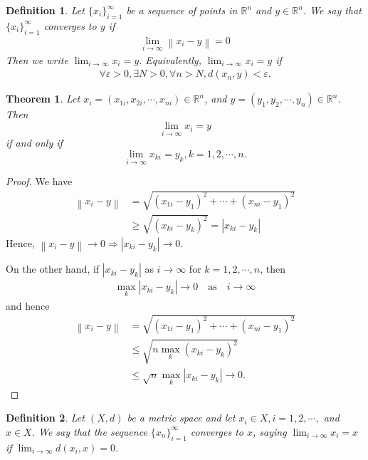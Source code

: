 \documentclass[12pt,leqno]{amsart}
\newtheorem{definition}{Definition}[section]
\newtheorem{theorem}{Theorem}[section]
\theoremstyle{definition}
\numberwithin{equation}{subsection}
\begin{document}
\begin{definition}
Let $\{x_i\}^\infty_{i=1}$ be a sequence of points in $\mathbb{R}^n$ and $y\in\mathbb{R}^n$. We say that $\{x_i\}^\infty_{i=1}$ converges to $y$ if 
\begin{align*}
    \lim_{i\to\infty}\left\|x_i - y \right\| = 0
\end{align*}
Then we write $\lim_{i\to\infty}x_i = y$. Equivalently, $\lim_{i\to\infty}x_i = y$ if \begin{align*}
    \forall \varepsilon > 0, \exists N > 0, \forall n > N, d(x_n, y) < \varepsilon.
\end{align*}
\end{definition}

\medskip

\begin{theorem}
Let $x_i = (x_{1i}, x_{2i}, \cdots, x_{ni}) \in \mathbb{R}^n$, and $y = (y_{1}, y_{2}, \cdots, y_{n}) \in \mathbb{R}^n$. Then 
$$\lim_{i\to\infty}x_i = y$$ if and only if $$\lim_{i\to\infty}x_{ki} = y_k,k = 1,2,\cdots,n.$$
\end{theorem}
\begin{proof}
We have 
\begin{align*}
    \left\|x_i - y\right\| & = \sqrt{(x_{1i}-y_1)^2 + \cdots + (x_{ni}-y_1)^2} \\
    & \geq \sqrt{(x_{ki}-y_k)^2} = |x_{ki} - y_k|
\end{align*}
Hence, $\left\|x_i - y\right\| \to 0 \Rightarrow |x_{ki} - y_k| \to 0$.

On the other hand, if $|x_{ki} - y_k|$ as $i\to\infty$ for $k = 1,2,\cdots, n$, then
\begin{align*}
    \max_k |x_{ki} - y_k| \to 0 \quad \text{as}\quad i\to\infty
\end{align*}
and hence
\begin{align*}
    \left\|x_i - y\right\| & = \sqrt{(x_{1i}-y_1)^2 + \cdots + (x_{ni}-y_1)^2} \\
    & \leq \sqrt{n \max_k (x_{ki}-y_k)^2} \\
    & \leq \sqrt{n} \max_k |x_{ki} - y_k| \to 0.
\end{align*}
\end{proof}

\begin{definition}
Let $(X,d)$ be a metric space and let $x_i\in X, i = 1,2,\cdots,$ and $x\in X$. We say that the sequence $\{x_n\}^\infty_{i=1}$ converges to $x$, saying
$\lim_{i\to\infty}x_i = x$ if $\lim_{i\to\infty}d(x_i, x) = 0$.
\end{definition}
\end{document}
